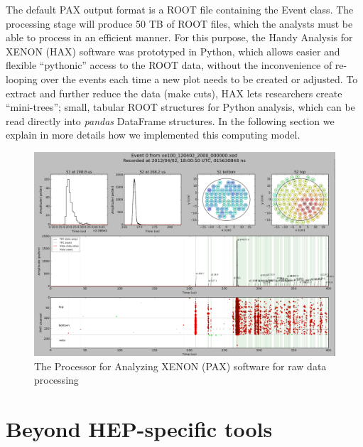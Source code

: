 \documentclass[a4paper]{jpconf}
\begin{document}
The default PAX output format is a ROOT file containing the Event class. 
The processing stage will produce 50 TB of ROOT files, which the analysts must be able to process in an efficient manner. 
For this purpose, the Handy Analysis for XENON (HAX) software was prototyped in Python, which 
allows easier and flexible ``pythonic'' access to the ROOT data, without the inconvenience of re-looping over the events each time 
a new plot needs to be created or adjusted. To extract and further reduce the data (make cuts), HAX lets researchers create ``mini-trees''; small, tabular ROOT structures for 
Python analysis, which can be read directly into \textit{pandas} DataFrame structures.
In the following section we explain in more details how we implemented this computing model.

\begin{figure}[!t]
 \centering
\begin{center}
\includegraphics[width=0.9\linewidth]{./graphics/paxer.png}
\end{center}
\caption{The Processor for Analyzing XENON (PAX) software for raw data processing}
\label{fig:paxer}
\end{figure}

\section{Beyond HEP-specific tools}
\end{document}
